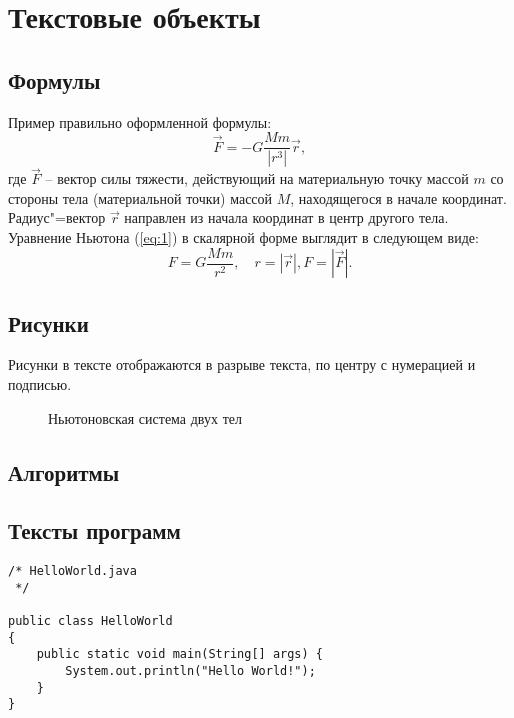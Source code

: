 \documentclass[a4paper,14pt,final]{extreport}
\begin{document}
\section{Текстовые объекты}
\label{sec:objs}

\subsection{Формулы}
\label{sec:formulae}

Пример правильно оформленной формулы:
\begin{equation}
  \label{eq:1}
  \vec{F} = -G\frac{Mm}{|r^3|}\vec{r},
\end{equation}
где $\vec{F}$ -- вектор силы тяжести, действующий на материальную точку массой $m$ со стороны тела (материальной точки) массой $M$, находящегося в начале координат.  Радиус"=вектор $\vec{r}$ направлен из начала координат в центр другого тела.  Уравнение Ньютона (\ref{eq:1}) в скалярной форме выглядит в следующем виде:
\begin{equation*}
  F=G\frac{Mm}{r^2},\quad r=|\vec{r}|, F=|\vec{F}|.
\end{equation*}

\subsection{Рисунки}
\label{sec:figures}

Рисунки в тексте отображаются в разрыве текста, по центру с нумерацией и подписью.
\begin{figure}[bh]
  \centering
  \def\svgwidth{0.8\linewidth}
  


  \caption{Ньютоновская система двух тел}
  \label{fig:bodies}
\end{figure}


\subsection{Алгоритмы}
\label{sec:algs}

\subsection{Тексты программ}
\label{sec:sources}

\begin{verbatim}
/* HelloWorld.java
 */

public class HelloWorld
{
	public static void main(String[] args) {
		System.out.println("Hello World!");
	}
}
\end{verbatim}
\end{document}
